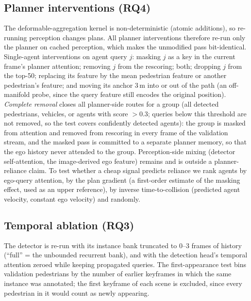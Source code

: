 \documentclass[journal]{IEEEtran}
\newcommand{\RQ}[1]{\textbf{RQ#1}}
\begin{document}
\subsection{Planner interventions (\RQ4)}
The deformable-aggregation kernel is non-deterministic (atomic additions), so re-running perception changes plans.
All planner interventions therefore re-run only the planner on cached perception, which makes the unmodified pass
bit-identical. Single-agent interventions on agent query $j$: masking $j$ as a key in the current frame's planner
attention; removing $j$ from the rescoring; both; dropping $j$ from the top-50; replacing its feature by the mean
pedestrian feature or another pedestrian's feature; and moving its anchor 3\,m into or out of the path (an
off-manifold probe, since the query feature still encodes the original position). \emph{Complete removal} closes all
planner-side routes for a group (all detected pedestrians, vehicles, or agents with score $>0.3$; queries below this
threshold are not removed, so the test covers confidently detected agents): the group is masked
from attention and removed from rescoring in every frame of the validation stream, and the masked pass is committed to
a separate planner memory, so that the ego history never attended to the group. Perception-side mixing (detector
self-attention, the image-derived ego feature) remains and is outside a planner-reliance claim. To test whether a
cheap signal predicts reliance we rank agents by ego-query attention, by the plan gradient (a first-order estimate of
the masking effect, used as an upper reference), by inverse time-to-collision (predicted agent velocity, constant ego
velocity) and randomly.

\subsection{Temporal ablation (\RQ3)}
The detector is re-run with its instance bank truncated to 0--3 frames of history (``full'' = the unbounded recurrent
bank), and with the detection head's temporal attention zeroed while keeping propagated queries. The first-appearance
test bins validation pedestrians by the number of earlier keyframes in which the same instance was annotated; the
first keyframe of each scene is excluded, since every pedestrian in it would count as newly appearing.
\end{document}
